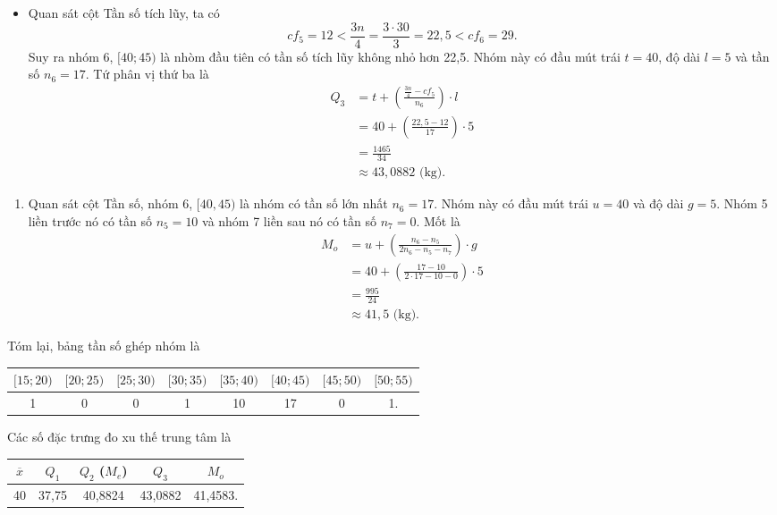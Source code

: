 \documentclass[
  letterpaper,
  DIV=11,
  numbers=noendperiod]{scrartcl}
\providecommand{\tightlist}{%
  \setlength{\itemsep}{0pt}\setlength{\parskip}{0pt}}\usepackage{longtable,booktabs,array}
\begin{document}
\begin{itemize}
\tightlist
\item
  Quan sát cột Tần số tích lũy, ta có \[
  cf_5=12<\frac{3n}{4}=\frac{3\cdot 30}{3}=22,5<cf_6=29.
  \] Suy ra nhóm 6, \([40;45)\) là nhòm đầu tiên có tần số tích lũy
  không nhỏ hơn 22,5. Nhóm này có đầu mút trái \(t=40\), độ dài \(l=5\)
  và tần số \(n_6=17\). Tứ phân vị thứ ba là \begin{align*}
        Q_3
            & = t + \left(\frac{\frac{3n}{4}-cf_5}{n_6}\right)\cdot l \\
            & = 40 +\left(\frac{22,5-12}{17}\right) \cdot 5 \\
            & = \frac{1465}{34} \\
            & \approx 43,0882 \text{ (kg).} 
    \end{align*}
\end{itemize}

\begin{enumerate}
\def\labelenumi{\alph{enumi}.}
\setcounter{enumi}{2}
\tightlist
\item
  Quan sát cột Tần số, nhóm 6, \([40,45)\) là nhóm có tần số lớn nhất
  \(n_6=17\). Nhóm này có đầu mút trái \(u=40\) và độ dài \(g=5\). Nhóm
  5 liền trước nó có tần số \(n_5=10\) và nhóm 7 liền sau nó có tần số
  \(n_7=0\). Mốt là \begin{align*}
       M_o 
           & = u + \left(\frac{n_6-n_5}{2n_6 - n_5 - n_7}\right)\cdot g \\
           & = 40 + \left(\frac{17-10}{2\cdot 17 - 10 - 0}\right)\cdot 5 \\
           & = \frac{995}{24} \\
           & \approx 41,5 \text{ (kg).}
   \end{align*}
\end{enumerate}

Tóm lại, bảng tần số ghép nhóm là

\begin{center}
\begin{tabular}{|c|c|c|c|c|c|c|c|}
\hline 
$[15;20)$ & $[20; 25)$ & $[25; 30)$ & $[30; 35)$ & $[35;40)$ & $[40; 45)$ & $[45;50)$ & $[50;55)$ \\
\hline 
1 & 0 & 0 & 1 & 10 & 17 & 0 & 1. \\
\hline
\end{tabular}
\end{center}

Các số đặc trưng đo xu thế trung tâm là

\begin{center}
\begin{tabular}{|c|c|c|c|c|}
\hline
$\overline{x}$ & $Q_1$ & $Q_2$ ($M_e$) & $Q_3$ & $M_o$ \\
\hline
40 & 37,75 & 40,8824 & 43,0882 & 41,4583. \\
\hline 
\end{tabular}
\end{center}
\end{document}
